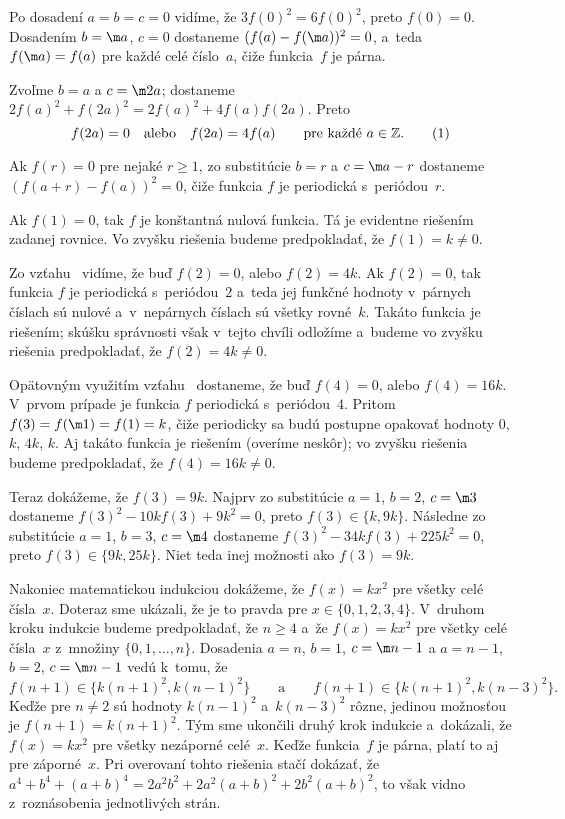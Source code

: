 {%
Po dosadení $a=b=c=0$ vidíme, že $3f(0)^2=6f(0)^2$, preto $f(0)=0$.
Dosadením $b=\m a$, $c=0$ dostaneme $(f(a)-f(\m a))^2=0$, a~teda $f(\m a)=f(a)$ pre každé celé číslo~$a$, čiže funkcia~$f$ je párna.

Zvoľme $b=a$ a $c=\m2a$; dostaneme $2f(a)^2+f(2a)^2=2f(a)^2+4f(a)f(2a)$. Preto
$$
f(2a)=0\quad\text{alebo}\quad f(2a)=4f(a)\qquad\text{pre každé $a\in \Bbb Z$}.
\tag1%
$$

Ak $f(r)=0$ pre nejaké $r\ge 1$, zo substitúcie $b=r$ a $c=\m a-r$ dostaneme $(f(a+r)-f(a))^2=0$, čiže funkcia $f$ je periodická s~periódou~$r$.

Ak $f(1)=0$, tak $f$ je konštantná nulová funkcia. Tá je evidentne riešením zadanej rovnice. Vo zvyšku riešenia budeme predpokladať, že $f(1)=k\ne 0$.

Zo vzťahu~ vidíme, že buď $f(2)=0$, alebo $f(2)=4k$. Ak $f(2)=0$, tak funkcia $f$ je periodická s~periódou~$2$ a~teda jej funkčné hodnoty v~párnych číslach sú nulové a~v~nepárnych číslach sú všetky rovné~$k$. Takáto funkcia je riešením; skúšku správnosti však v~tejto chvíli odložíme a~budeme vo zvyšku riešenia predpokladať, že $f(2)=4k\ne 0$.

Opätovným využitím vzťahu~ dostaneme, že buď $f(4) = 0$, alebo $f(4)=16k$. V~prvom prípade je funkcia $f$ periodická s~periódou~$4$. Pritom $f(3)=f(\m1)=f(1)=k$, čiže periodicky sa budú postupne opakovať hodnoty $0$, $k$, $4k$, $k$. Aj takáto funkcia je riešením (overíme neskôr); vo zvyšku riešenia budeme predpokladať, že $f(4)=16k\ne 0$.

Teraz dokážeme, že $f(3)=9k$. Najprv zo substitúcie $a=1$, $b=2$, $c=\m3$ dostaneme $f(3)^2-10k f(3)+9k^2=0$, preto $f(3)\in\{k, 9k\}$.
Následne zo substitúcie $a=1$, $b=3$, $c=\m4$ dostaneme $f(3)^2-34k f(3)+ 225k^2=0$, preto $f(3)\in\{9k, 25k\}$. Niet teda inej možnosti ako $f(3)=9k$.

Nakoniec matematickou indukciou dokážeme, že $f(x)=kx^2$ pre všetky celé čísla~$x$. Doteraz sme ukázali, že je to pravda pre $x\in\{0,1,2,3,4\}$.
V~druhom kroku indukcie budeme predpokladať, že $n\ge 4$ a~že $f(x)=kx^2$ pre všetky celé čísla~$x$ z~množiny $\{0, 1,\dots, n\}$.
Dosadenia $a=n$, $b=1$, $c=\m n-1$ a $a=n-1$, $b=2$, $c=\m n-1$ vedú k~tomu, že
$$
f(n+1)\in\{k(n+1)^2, k(n-1)^2\}\qquad \text{a}\qquad f(n+1)\in\{k(n+1)^2, k(n-3)^2\}.
$$
Keďže pre $n\ne 2$ sú hodnoty $k(n-1)^2$ a~$k(n-3)^2$ rôzne, jedinou možnosťou je ${f(n+1)}=k(n+1)^2$.
Tým sme ukončili druhý krok indukcie a~dokázali, že $f(x)=kx^2$ pre všetky nezáporné celé~$x$.
Keďže funkcia~$f$ je párna, platí to aj pre záporné~$x$.
Pri overovaní tohto riešenia stačí dokázať, že $a^4+b^4+(a+b)^4=2a^2b^2+2a^2(a+b)^2+2b^2(a+b)^2$, to však vidno z~roznásobenia jednotlivých strán.

}
